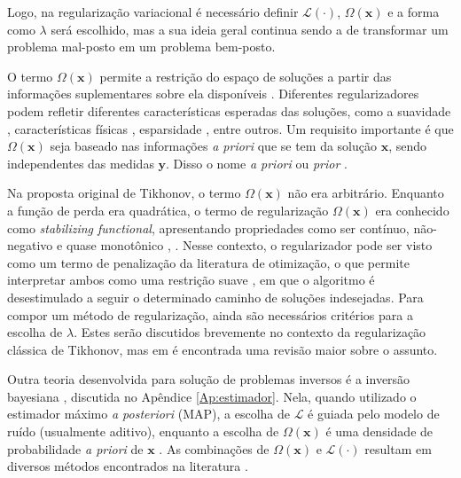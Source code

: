 Logo, na regularização variacional é necessário definir $\mathcal{L}(\cdot)$, $\Omega(\mathbf{x})$ e a forma como $\lambda$ será escolhido, mas a sua ideia geral continua sendo a de transformar um problema mal-posto em um problema bem-posto. 

O termo $\Omega(\mathbf{x})$ permite a restrição do espaço de soluções a partir das informações suplementares sobre ela disponíveis \cite[ pág. 59]{tikhonov1977solutions}. Diferentes regularizadores podem refletir diferentes características esperadas das soluções, como a suavidade \cite[ pág. 70]{tikhonov1977solutions}, características físicas  \cite[pág. 8]{Bertero2021}, esparsidade \cite{Daubechies2004, Daubechies2016}, entre outros. Um requisito importante é que $\Omega(\mathbf{x})$ seja baseado nas informações \textit{a priori} que se tem da solução $\mathbf{x}$, sendo independentes das medidas $\mathbf{y}$. Disso o nome \textit{a priori} ou \textit{prior} \cite[pág. 2]{kaipio2005statistical}. 

Na proposta original de Tikhonov, o termo $\Omega(\mathbf{x})$ não era arbitrário. Enquanto a função de perda era quadrática, o termo de regularização $\Omega(\mathbf{x})$ era conhecido como \textit{stabilizing functional}, apresentando propriedades como ser contínuo, não-negativo \cite[pág. 50-1, 71]{tikhonov1977solutions} e quase monotônico \cite[pág. 56]{tikhonov1977solutions}, \cite[págs 420-1]{Vapnik2006}. Nesse contexto, o regularizador pode ser visto como um termo de penalização da literatura de otimização, o que permite interpretar ambos como uma restrição suave \cite[pág. 20]{andreasson2020an}, em que o algoritmo é desestimulado a seguir o determinado caminho de soluções indesejadas.  Para compor um método de regularização, ainda são necessários critérios para a escolha de $\lambda$. Estes serão discutidos brevemente no contexto da regularização clássica de Tikhonov, mas em \cite[Capítulo 7]{Hansen1998} é encontrada uma revisão maior sobre o assunto. 

Outra teoria desenvolvida para solução de problemas inversos é a inversão bayesiana \cite{tarantola2005inverse}, discutida no Apêndice \ref{Ap:estimador}. Nela, quando utilizado o estimador máximo \textit{a posteriori} (MAP), a escolha de $\mathcal{L}$ é guiada pelo modelo de ruído (usualmente aditivo), enquanto a escolha de $\Omega(\mathbf{x})$ é uma densidade de probabilidade \textit{a priori} de $\mathbf{x}$ \cite{kaipio2005statistical}. As combinações de $\Omega(\mathbf{x})$ e $\mathcal{L}(\cdot)$ resultam em diversos métodos encontrados na literatura \cite[pág. 111]{alvarez2017digital}. 

